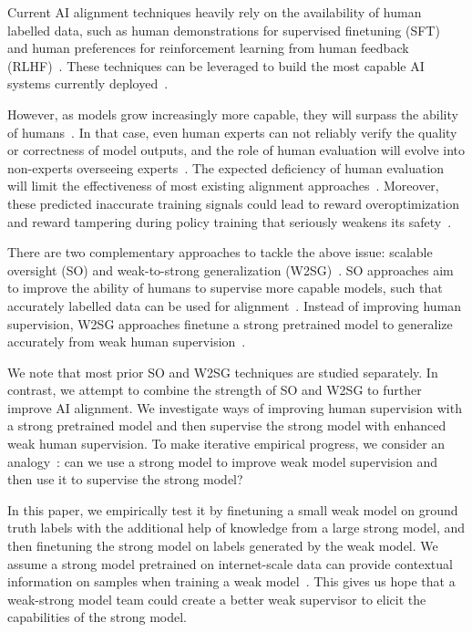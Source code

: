 \documentclass[letterpaper]{article} %
\begin{document}
Current AI alignment techniques heavily rely on the availability of human labelled data, such as human demonstrations for supervised finetuning (SFT)~\cite{wei2021finetuned,chung2024scaling} and human preferences for reinforcement learning from human feedback (RLHF)~\cite{christiano2017deep,ouyang2022training,bai2022training}.
These techniques can be leveraged to build the most capable AI systems currently deployed~\cite{OpenAI2023Gpt-4,Anthropic2023Introducing}.

However, as models grow increasingly more capable, they will surpass the ability of humans~\cite{CAIS2023Statement}.
In that case, even human experts can not reliably verify the quality or correctness of model outputs, and the role of human evaluation will evolve into non-experts overseeing experts~\cite{amodei2016concrete,bowman2022measuring,burns2023weak,khan2024debating}.
The expected deficiency of human evaluation will limit the effectiveness of most existing alignment approaches~\cite{casper2023open,mcaleese2024llm}.
Moreover, these predicted inaccurate training signals could lead to reward overoptimization and reward tampering during policy training that seriously weakens its safety~\cite{gao2023scaling,denison2024sycophancy}.

There are two complementary approaches to tackle the above issue: scalable oversight (SO) and weak-to-strong generalization (W2SG)~\cite{JAN2023Combining}.
SO approaches aim to improve the ability of humans to supervise more capable models, such that accurately labelled data can be used for alignment~\cite{bowman2022measuring}.
Instead of improving human supervision, W2SG approaches finetune a strong pretrained model to generalize accurately from weak human supervision~\cite{burns2023weak}.

We note that most prior SO and W2SG techniques are studied separately.
In contrast, we attempt to combine the strength of SO and W2SG to further improve AI alignment.
We investigate ways of improving human supervision with a strong pretrained model and then supervise the strong model with enhanced weak human supervision.
To make iterative empirical progress, we consider an analogy~\cite{burns2023weak,kenton2024scalable}: can we use a strong model to improve weak model supervision and then use it to supervise the strong model?

In this paper, we empirically test it by finetuning a small weak model on ground truth labels with the additional help of knowledge from a large strong model, and then finetuning the strong model on labels generated by the weak model.
We assume a strong model pretrained on internet-scale data can provide contextual information on samples when training a weak model~\cite{brown2020language}.
This gives us hope that a weak-strong model team could create a better weak supervisor to elicit the capabilities of the strong model.
\end{document}
